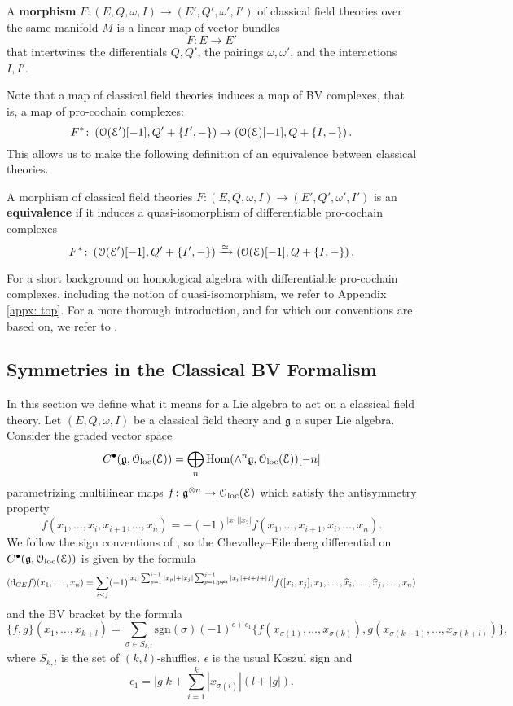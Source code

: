 \documentclass[10pt, oneside]{article}
\begin{document}
\begin{definition}
A {\bf morphism} $F\colon (E, Q, \omega, I) \to (E', Q', \omega', I')$ of classical field theories over the same manifold $M$ is a linear map of vector bundles
\[
F\colon E \to E'
\]
that intertwines the differentials $Q, Q'$, the pairings $\omega, \omega'$, and the interactions $I,I'$. 
\end{definition}

Note that a map of classical field theories induces a map of BV complexes, that is, a map of pro-cochain complexes:
\[
F^*\colon \left(\mathcal O (\mathcal E')[-1], Q' + \{I',-\} \right) \to \left(\mathcal O (\mathcal E)[-1], Q + \{I,-\} \right).
\]
This allows us to make the following definition of an equivalence between classical theories. 

\begin{definition} \label{equivalence_def}
A morphism of classical field theories $F\colon (E, Q, \omega, I) \to (E', Q', \omega', I')$ is an {\bf equivalence} if it induces a quasi-isomorphism of differentiable pro-cochain complexes
\[
F^* \colon  \left(\mathcal O(\mathcal E')[-1], Q' + \{I',-\} \right) \xrightarrow{\simeq} \left(\mathcal O(\mathcal E)[-1], Q + \{I,-\} \right) .
\]
\end{definition}

For a short background on homological algebra with differentiable pro-cochain complexes, including the notion of quasi-isomorphism, we refer to Appendix \ref{appx: top}.
For a more thorough introduction, and for which our conventions are based on, we refer to \cite{Book1}.

\subsection{Symmetries in the Classical BV Formalism} \label{symmetry_section}

In this section we define what it means for a Lie algebra to act on a classical field theory. Let $(E, Q,\omega, I)$ be a classical field theory and $\mathfrak g$ a super Lie algebra. Consider the graded vector space
\[C^\bullet(\mathfrak g, \mathcal{O}_{\rm loc}(\mathcal E)) = \bigoplus_n \operatorname{Hom}(\wedge^n \mathfrak g, \mathcal{O}_{\rm loc}(\mathcal E))[-n]\]
parametrizing multilinear maps $f\colon \mathfrak g^{\otimes n}\rightarrow \mathcal{O}_{\rm loc}(\mathcal E)$ which satisfy the antisymmetry property
\[f(x_1, \dots, x_i, x_{i+1}, \dots, x_n) = -(-1)^{|x_1||x_2|} f(x_1, \dots, x_{i+1}, x_i, \dots, x_n).\]
We follow the sign conventions of \cite{SafronovCoisoInt}, so the Chevalley--Eilenberg differential on $C^\bullet(\mathfrak g, \mathcal{O}_{\rm loc}(\mathcal E))$ is given by the formula
\[({\rm d}_{CE} f)(x_1, \dots, x_n) = \sum_{i < j}(-1)^{|x_i| \sum_{p=1}^{i-1} |x_p| + |x_j| \sum_{p=1,p\neq i}^{j-1} |x_p| +i+j+|f|} f([x_i, x_j], x_1, \dots, \widehat{x}_i, \dots, \widehat{x}_j, \dots, x_n)\]
and the BV bracket by the formula
\[\{f, g\}(x_1, \dots, x_{k+l}) = \sum_{\sigma\in S_{k, l}} \mathrm{sgn}(\sigma) (-1)^{\epsilon+\epsilon_1} \{f(x_{\sigma(1)}, \dots, x_{\sigma(k)}), g(x_{\sigma(k+1)}, \dots, x_{\sigma(k+l)})\},\]
where $S_{k, l}$ is the set of $(k, l)$-shuffles, $\epsilon$ is the usual Koszul sign and
\[\epsilon_1 = |g|k + \sum_{i=1}^k |x_{\sigma(i)}|(l+|g|).\]
\end{document}
